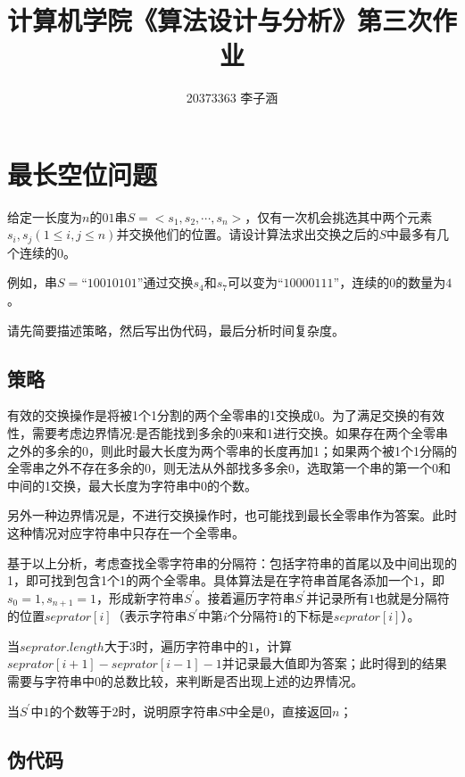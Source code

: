 \documentclass{article}
\title{ 计算机学院《算法设计与分析》第三次作业}
\author{20373363 李子涵}
\begin{document}
\maketitle

\section{最长空位问题} %


给定一长度为$n$的$01$串$S=<s_1, s_2, \cdots ,s_n>$，仅有一次机会挑选其中两个元素$s_i, s_j(1 \le i, j \le n)$并交换他们的位置。请设计算法求出交换之后的$S$中最多有几个连续的$0$。

例如，串$S=“10010101”$通过交换$s_4$和$s_7$可以变为$“10000111”$，连续的$0$的数量为$4$。

请先简要描述策略，然后写出伪代码，最后分析时间复杂度。

\subsection{策略} %

有效的交换操作是将被1个1分割的两个全零串的1交换成0。为了满足交换的有效性，需要考虑边界情况:是否能找到多余的0来和1进行交换。如果存在两个全零串之外的多余的0，则此时最大长度为两个零串的长度再加1；如果两个被1个1分隔的全零串之外不存在多余的0，则无法从外部找多多余0，选取第一个串的第一个0和中间的1交换，最大长度为字符串中0的个数。

另外一种边界情况是，不进行交换操作时，也可能找到最长全零串作为答案。此时这种情况对应字符串中只存在一个全零串。

基于以上分析，考虑查找全零字符串的分隔符：包括字符串的首尾以及中间出现的1，即可找到包含1个1的两个全零串。具体算法是在字符串首尾各添加一个$1$，即$s_0=1, s_{n+1}=1$，形成新字符串$S^{\prime}$。接着遍历字符串$S^{\prime}$并记录所有$1$也就是分隔符的位置$seprator[i]$（表示字符串$S^{\prime}$中第$i$个分隔符$1$的下标是$seprator[i]$）。

当$seprator.length$大于$3$时，遍历字符串中的$1$，计算$seprator[i+1]-seprator[i-1] - 1$并记录最大值即为答案；此时得到的结果需要与字符串中0的总数比较，来判断是否出现上述的边界情况。

当$S^{\prime}$中$1$的个数等于$2$时，说明原字符串$S$中全是$0$，直接返回$n$；

\subsection{伪代码}
\end{document}
